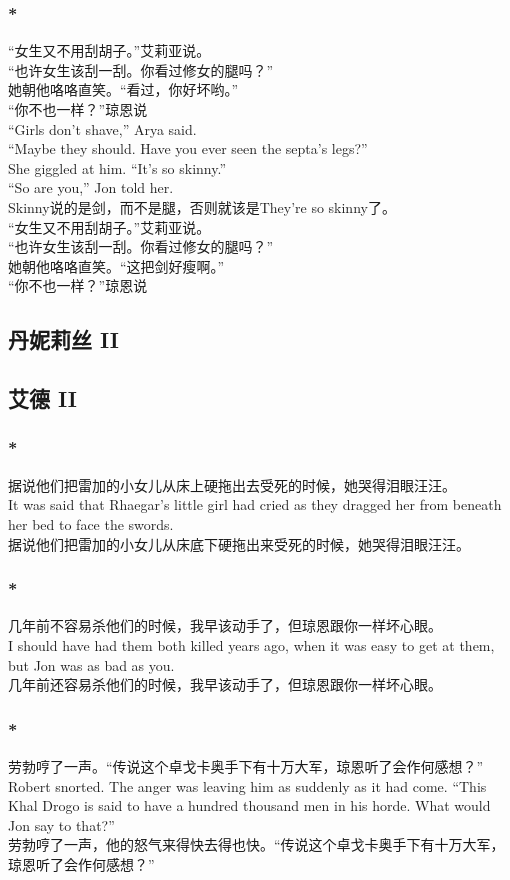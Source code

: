 \documentclass[12pt,a4paper]{article}
\newcommand{\h}[1]{{\color{red}#1}\\}
\newcommand{\la}[1]{{\color{blue}#1}\\}
\begin{document}
\subsubsection{\color{red}*}\la{
“女生又不用刮胡子。”艾莉亚说。\\“也许女生该刮一刮。你看过修女的腿吗？”\\她朝他咯咯直笑。“看过，你好坏哟。”\\“你不也一样？”琼恩说\\
“Girls don't shave,” Arya said.\\“Maybe they should. Have you ever seen the septa's legs?”\\
She giggled at him. “It's so skinny.”\\“So are you,” Jon told her.}\h{
Skinny说的是剑，而不是腿，否则就该是They're so skinny了。}
“女生又不用刮胡子。”艾莉亚说。\\“也许女生该刮一刮。你看过修女的腿吗？”\\她朝他咯咯直笑。“这把剑好瘦啊。”\\“你不也一样？”琼恩说
	
\subsection{丹妮莉丝 II}
\subsection{艾德 II}
\subsubsection{\color{red}*}\la{
据说他们把雷加的小女儿从床上硬拖出去受死的时候，她哭得泪眼汪汪。\\
It was said that Rhaegar's little girl had cried as they dragged her from beneath her bed to face the swords. }
据说他们把雷加的小女儿从床底下硬拖出来受死的时候，她哭得泪眼汪汪。


\subsubsection{\color{red}*}\la{
几年前不容易杀他们的时候，我早该动手了，但琼恩跟你一样坏心眼。\\
I should have had them both killed years ago, when it was easy to get at them, but Jon was as bad as you.}
几年前还容易杀他们的时候，我早该动手了，但琼恩跟你一样坏心眼。


\subsubsection{\color{red}*}\la{
劳勃哼了一声。“传说这个卓戈卡奥手下有十万大军，琼恩听了会作何感想？”\\
Robert snorted. The anger was leaving him as suddenly as it had come. “This Khal Drogo is said to have a hundred thousand men in his horde. What would Jon say to that?”}
劳勃哼了一声，他的怒气来得快去得也快。“传说这个卓戈卡奥手下有十万大军，琼恩听了会作何感想？”
\end{document}
